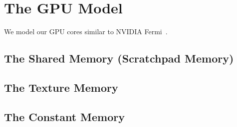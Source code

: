 
\clearpage
\section{The GPU Model}


We model our GPU cores similar to NVIDIA Fermi~\cite{fermi}.



\subsection{The Shared Memory (Scratchpad Memory)}


\subsection{The Texture Memory}


\subsection{The Constant Memory}





